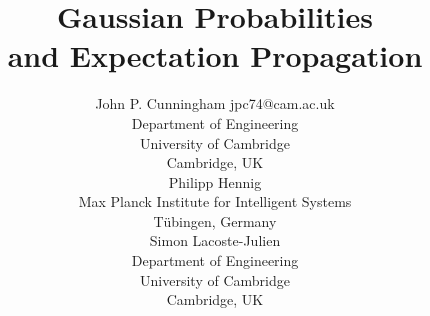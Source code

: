 \documentclass[twoside,11pt]{article}
\newcommand{\phtodo}[1]{\textcolor{blue}{[#1]}}
\newcommand{\sljtodo}[1]{\textcolor{green}{[#1]}}
\begin{document}


\newpage

\title{Gaussian Probabilities\\ and Expectation Propagation}


\author{%
\name John P. Cunningham
\email jpc74@cam.ac.uk \\
\addr Department of Engineering\\
University of Cambridge\\
Cambridge, UK\\
\AND
\name Philipp Hennig
 \\
\addr Max Planck Institute for Intelligent Systems\\
T\"ubingen, Germany\\
\AND
\name Simon Lacoste-Julien
 \\
\addr Department of Engineering\\
University of Cambridge\\
Cambridge, UK\\
}
\end{document}

